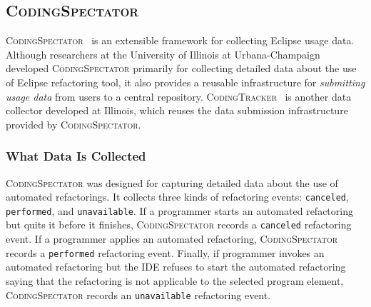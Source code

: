 \newcommand\CodingSpectator{\textsc{CodingSpectator}}

\newcommand\CodingTracker{\textsc{CodingTracker}}

\newcommand\Performed{\texttt{performed}}

\newcommand\Canceled{\texttt{canceled}}

\newcommand\Unavailable{\texttt{unavailable}}



\subsection{\CodingSpectator}
\label{CodingSpectator}

\CodingSpectator~\cite{CodingSpectatorWebPage, VakilianETAL2011Richer,
VakilianETAL2012UseDisuseMisuse, VakilianETAL2013Compositional} is an extensible
framework for collecting Eclipse usage data. Although researchers at the
University of Illinois at Urbana-Champaign developed \CodingSpectator{}
primarily for collecting detailed data about the use of Eclipse refactoring
tool, it also provides a reusable infrastructure for \emph{submitting usage
data} from users to a central repository.
\CodingTracker~\cite{NegaraETAL2012Dangerous, NegaraETAL2013ManualRefactorings,
CodingTrackerWebPage} is another data collector developed at Illinois, which
reuses the data submission infrastructure provided by \CodingSpectator.

\subsubsection{What Data Is Collected}

\CodingSpectator{} was designed for capturing detailed data about the use of
automated refactorings. It collects three kinds of refactoring events:
\Canceled, \Performed, and \Unavailable. If a programmer starts an automated
refactoring but quits it before it finishes, \CodingSpectator{} records a
\Canceled{} refactoring event. If a programmer applies an automated refactoring,
\CodingSpectator{} records a \Performed{} refactoring event. Finally, if
programmer invokes an automated refactoring but the IDE refuses to start the
automated refactoring saying that the refactoring is not applicable to the
selected program element, \CodingSpectator{} records an \Unavailable{}
refactoring event.

